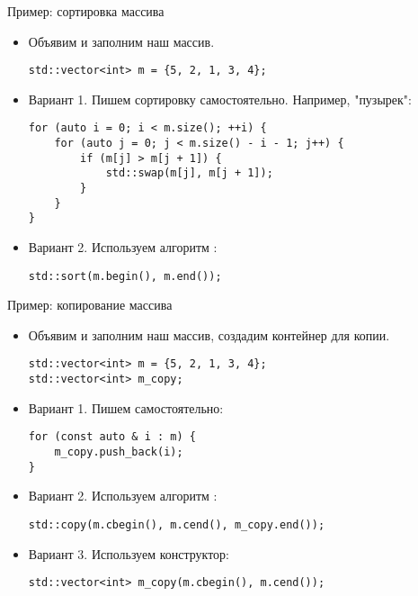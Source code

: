 \documentclass{beamer}
\begin{document}
\begin{frame}[fragile]{Пример: сортировка массива}
    \begin{itemize}
        \item Объявим и заполним наш массив.
            \begin{lstlisting}
std::vector<int> m = {5, 2, 1, 3, 4};
            \end{lstlisting}
        \item Вариант 1. Пишем сортировку самостоятельно. Например, "пузырек":
            \begin{lstlisting}
for (auto i = 0; i < m.size(); ++i) {
    for (auto j = 0; j < m.size() - i - 1; j++) {
        if (m[j] > m[j + 1]) {
            std::swap(m[j], m[j + 1]);
        }
    }
}
            \end{lstlisting}
        \item Вариант 2. Используем алгоритм :
            \begin{lstlisting}
std::sort(m.begin(), m.end());
            \end{lstlisting}
    \end{itemize}
\end{frame}

\begin{frame}[fragile]{Пример: копирование массива}
    \begin{itemize}
        \item Объявим и заполним наш массив, создадим контейнер для копии.
            \begin{lstlisting}
std::vector<int> m = {5, 2, 1, 3, 4};
std::vector<int> m_copy;
            \end{lstlisting}
        \item Вариант 1. Пишем самостоятельно:
            \begin{lstlisting}
for (const auto & i : m) {
    m_copy.push_back(i);
}
            \end{lstlisting}
        \item Вариант 2. Используем алгоритм :
            \begin{lstlisting}
std::copy(m.cbegin(), m.cend(), m_copy.end());
            \end{lstlisting}
        \item Вариант 3. Используем конструктор:
            \begin{lstlisting}
std::vector<int> m_copy(m.cbegin(), m.cend());
            \end{lstlisting}
    \end{itemize}
\end{frame}
\end{document}
